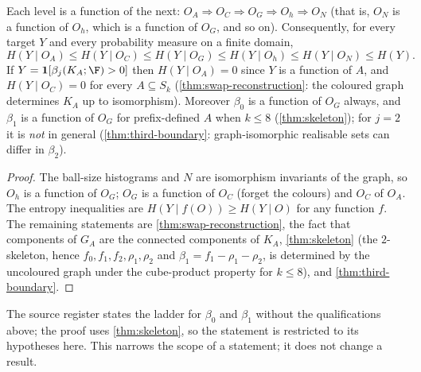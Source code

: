 \begin{theorem}\label{thm:obs-ladder}
Each level is a function of the next: $O_A\Rightarrow O_C\Rightarrow O_G\Rightarrow O_h\Rightarrow O_N$ (that is, $O_N$ is a function of $O_h$, which is a function of $O_G$, and so on). Consequently, for every target $Y$ and every probability measure on a finite domain,
\[
H(Y\mid O_A)\le H(Y\mid O_C)\le H(Y\mid O_G)\le H(Y\mid O_h)\le H(Y\mid O_N)\le H(Y).
\]
If $Y=\mathbf 1[\beta_j(K_A;\F)>0]$ then $H(Y\mid O_A)=0$ since $Y$ is a function of $A$, and $H(Y\mid O_C)=0$ for every $A\subseteq S_k$ (\cref{thm:swap-reconstruction}: the coloured graph determines $K_A$ up to isomorphism). Moreover $\beta_0$ is a function of $O_G$ always, and $\beta_1$ is a function of $O_G$ for prefix-defined $A$ when $k\le8$ (\cref{thm:skeleton}); for $j=2$ it is \emph{not} in general (\cref{thm:third-boundary}: graph-isomorphic realisable sets can differ in $\beta_2$).
\end{theorem}
\begin{proof}
The ball-size histograms and $N$ are isomorphism invariants of the graph, so $O_h$ is a function of $O_G$; $O_G$ is a function of $O_C$ (forget the colours) and $O_C$ of $O_A$. The entropy inequalities are $H(Y\mid f(O))\ge H(Y\mid O)$ for any function $f$. The remaining statements are \cref{thm:swap-reconstruction}, the fact that components of $G_A$ are the connected components of $K_A$, \cref{thm:skeleton} (the $2$-skeleton, hence $f_0,f_1,f_2,\rho_1,\rho_2$ and $\beta_1=f_1-\rho_1-\rho_2$, is determined by the uncoloured graph under the cube-product property for $k\le8$), and \cref{thm:third-boundary}.
\end{proof}
\begin{remark}[scope]
The source register states the ladder for $\beta_0$ and $\beta_1$ without the qualifications above; the proof uses \cref{thm:skeleton}, so the statement is restricted to its hypotheses here. This narrows the scope of a statement; it does not change a result.
\end{remark}

